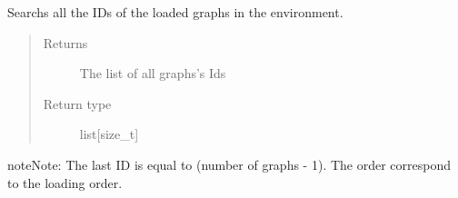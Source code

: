 \documentclass[letterpaper,10pt,english]{sphinxmanual}
\begin{document}

\begin{fulllineitems}
\label{doc:PythonGedLib.PyGetAllGraphIds}
Searchs all the IDs of the loaded graphs in the environment.
\begin{quote}\begin{description}
\item[{Returns}] \leavevmode
The list of all graphs's Ids

\item[{Return type}] \leavevmode
list{[}size\_t{]}

\end{description}\end{quote}

\begin{notice}{note}{Note:}
The last ID is equal to (number of graphs - 1). The order correspond to the loading order.
\end{notice}

\end{fulllineitems}

\end{document}
